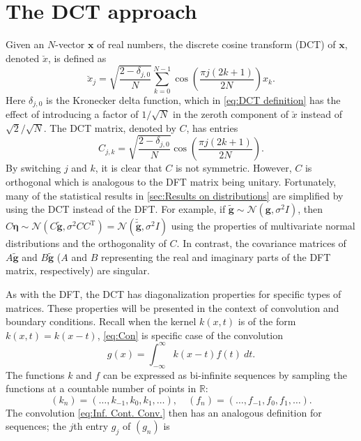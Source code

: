 \documentclass[12pt,notitlepage]{report}
\newcommand{\gVec}{\mathbf{g}}	%
\newcommand{\gnoiseVec}{\widetilde{\mathbf{g}}}	%
\newcommand{\trans}{\mathrm{T}}	%
\newcommand{\dct}[1]{\breve{#1}}	%
\newcommand{\noise}{\eta}	%
\newcommand{\noiseSD}{\sigma}	%
\newcommand{\noiseVec}{\bm{\noise}}	%
\begin{document}
\chapter{The DCT approach} \label{sec:DCT}
Given an $N$-vector $\mathbf{x}$ of real numbers, the discrete cosine transform (DCT) of $\mathbf{x}$, denoted $\dct{x}$, is defined as
\begin{equation}
\label{eq:DCT definition}
\dct{x}_j = \sqrt{\frac{2 - \delta_{j,0}}{N}} \sum_{k=0}^{N-1} \cos\left(\frac{\pi{j}(2k + 1)}{2N}\right) x_k.
\end{equation}
Here $\delta_{j,0}$ is the Kronecker delta function, which in \eqref{eq:DCT definition} has the effect of introducing a factor of $1/\sqrt{N}$ in the zeroth component of $\dct{x}$ instead of $\sqrt{2}/\sqrt{N}$. The DCT matrix, denoted by $C$, has entries
\begin{equation}
\label{eq:DCT matrix}
C_{j,k} = \sqrt{\frac{2 - \delta_{j,0}}{N}} \cos\left(\frac{\pi{j}(2k + 1)}{2N}\right).
\end{equation}
By switching $j$ and $k$, it is clear that $C$ is not symmetric. However, $C$ is orthogonal which is analogous to the DFT matrix being unitary. Fortunately, many of the statistical results in \ref{sec:Results on distributions} are simplified by using the DCT instead of the DFT. For example, if $\gnoiseVec \sim \mathcal{N}(\gVec,\noiseSD^2 I)$, then $C\noiseVec \sim \mathcal{N}(C\gnoiseVec,\noiseSD^2 CC^\trans) = \mathcal{N}(\dct{\gnoiseVec},\noiseSD^2 I)$ using the properties of multivariate normal distributions and the orthogonality of $C$. In contrast, the covariance matrices of $A\gnoiseVec$ and $B\gnoiseVec$ ($A$ and $B$ representing the real and imaginary parts of the DFT matrix, respectively) are singular. \par 
As with the DFT, the DCT has diagonalization properties for specific types of matrices. These properties will be presented in the context of convolution and boundary conditions. Recall when the kernel $k(x,t)$ is of the form $k(x,t) = k(x-t)$, \eqref{eq:Con} is specific case of the convolution
\begin{equation}
\label{eq:Inf. Cont. Conv.}
g(x) = \int_{-\infty}^{\infty} k(x-t)f(t) ~dt.
\end{equation}
The functions $k$ and $f$ can be expressed as bi-infinite sequences by sampling the functions at a countable number of points in $\mathbb{R}$:
\[(k_n) = (\ldots,k_{-1},k_{0},k_{1},\ldots), \quad (f_n) = (\ldots,f_{-1},f_{0},f_{1},\ldots).\]
The convolution \eqref{eq:Inf. Cont. Conv.} then has an analogous definition for sequences; the $j$th entry $g_j$ of $(g_n)$ is
\end{document}
